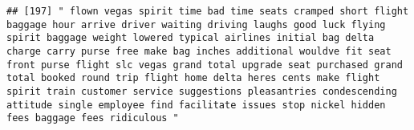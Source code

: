 \documentclass[
]{article}
\begin{document}
\begin{verbatim}
## [197] " flown vegas spirit time bad time seats cramped short flight baggage hour arrive driver waiting driving laughs good luck flying spirit baggage weight lowered typical airlines initial bag delta charge carry purse free make bag inches additional wouldve fit seat front purse flight slc vegas grand total upgrade seat purchased grand total booked round trip flight home delta heres cents make flight spirit train customer service suggestions pleasantries condescending attitude single employee find facilitate issues stop nickel hidden fees baggage fees ridiculous "                                                                                                                                                                                                                                                                                                                                                                                                                                                                                                                                                                                                                                                                                                                                                                                                                                                                                                                                                                                                                                                                                                                                                                                                            

\end{verbatim}
\end{document}
